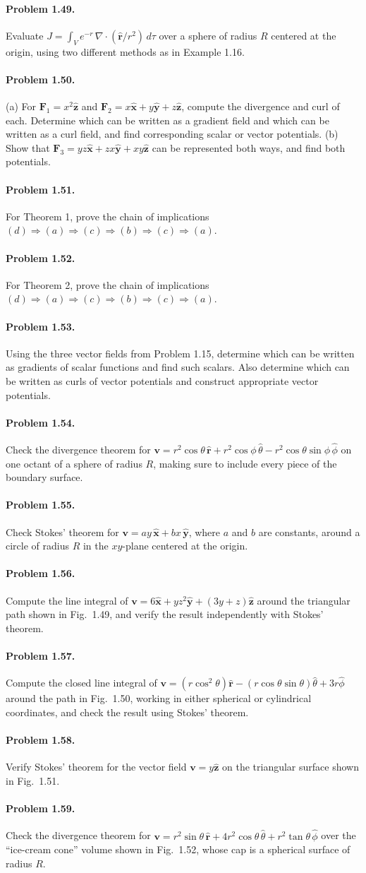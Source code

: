 \documentclass{aa}
\newcommand{\problemstatement}[2]{%
\paragraph{Problem #1.}#2\par\medskip
}
\begin{document}
\problemstatement{1.49}{Evaluate \(J=\int_V e^{-r}\,\nabla\cdot(\hat{\mathbf r}/r^2)\,d\tau\) over a sphere of radius \(R\) centered at the origin, using two different methods as in Example 1.16.}
\problemstatement{1.50}{(a) For \(\mathbf F_1=x^2\hat{\mathbf z}\) and \(\mathbf F_2=x\hat{\mathbf x}+y\hat{\mathbf y}+z\hat{\mathbf z}\), compute the divergence and curl of each. Determine which can be written as a gradient field and which can be written as a curl field, and find corresponding scalar or vector potentials. (b) Show that \(\mathbf F_3=yz\hat{\mathbf x}+zx\hat{\mathbf y}+xy\hat{\mathbf z}\) can be represented both ways, and find both potentials.}
\problemstatement{1.51}{For Theorem 1, prove the chain of implications \((d)\Rightarrow(a)\Rightarrow(c)\Rightarrow(b)\Rightarrow(c)\Rightarrow(a)\).}
\problemstatement{1.52}{For Theorem 2, prove the chain of implications \((d)\Rightarrow(a)\Rightarrow(c)\Rightarrow(b)\Rightarrow(c)\Rightarrow(a)\).}
\problemstatement{1.53}{Using the three vector fields from Problem 1.15, determine which can be written as gradients of scalar functions and find such scalars. Also determine which can be written as curls of vector potentials and construct appropriate vector potentials.}
\problemstatement{1.54}{Check the divergence theorem for \(\mathbf v=r^2\cos\theta\,\hat{\mathbf r}+r^2\cos\phi\,\hat{\theta}-r^2\cos\theta\sin\phi\,\hat{\phi}\) on one octant of a sphere of radius \(R\), making sure to include every piece of the boundary surface.}
\problemstatement{1.55}{Check Stokes' theorem for \(\mathbf v=ay\,\hat{\mathbf x}+bx\,\hat{\mathbf y}\), where \(a\) and \(b\) are constants, around a circle of radius \(R\) in the \(xy\)-plane centered at the origin.}
\problemstatement{1.56}{Compute the line integral of \(\mathbf v=6\hat{\mathbf x}+yz^2\hat{\mathbf y}+(3y+z)\hat{\mathbf z}\) around the triangular path shown in Fig.~1.49, and verify the result independently with Stokes' theorem.}
\problemstatement{1.57}{Compute the closed line integral of \(\mathbf v=(r\cos^2\theta)\hat{\mathbf r}-(r\cos\theta\sin\theta)\hat{\theta}+3r\hat{\phi}\) around the path in Fig.~1.50, working in either spherical or cylindrical coordinates, and check the result using Stokes' theorem.}
\problemstatement{1.58}{Verify Stokes' theorem for the vector field \(\mathbf v=y\hat{\mathbf z}\) on the triangular surface shown in Fig.~1.51.}
\problemstatement{1.59}{Check the divergence theorem for \(\mathbf v=r^2\sin\theta\,\hat{\mathbf r}+4r^2\cos\theta\,\hat{\theta}+r^2\tan\theta\,\hat{\phi}\) over the ``ice-cream cone'' volume shown in Fig.~1.52, whose cap is a spherical surface of radius \(R\).}
\end{document}
